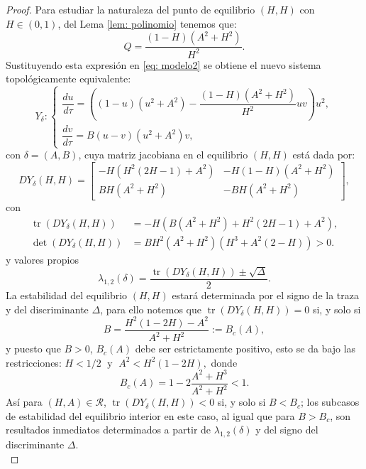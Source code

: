 \documentclass[]{article}
\theoremstyle{remark}
\begin{document}
	\begin{proof}
		Para estudiar la naturaleza del punto de equilibrio $(H,H)$ con $H \in (0,1)$, del Lema \autoref{lem: polinomio} tenemos que: $$Q=\dfrac{(1-H)(A^2+H^{2})}{H^{2}}.$$ Sustituyendo esta expresión en \eqref{eq: modelo2} se obtiene el nuevo sistema topológicamente equivalente:
		\begin{equation}
			Y_{\delta}:
			\begin{cases}
				\dfrac{du}{d \tau} = \left((1 - u)(u^{2} + A^{2}) - \dfrac{(1-H)(A^2+H^{2})}{H^{2}} u v\right)u^{2}, \\[5pt]
				\dfrac{dv}{d \tau} = B(u - v)(u^{2} + A^{2})v,
			\end{cases}
			\label{eq: modelo2.1}
		\end{equation}
		con $\delta = (A, B)$, cuya matriz jacobiana en el equilibrio $(H,H)$ está dada por:
		\begin{equation*}
			DY_\delta(H,H) =
			\begin{bmatrix}
				-H(H^{2}(2H-1)+A^2) & -H(1-H)(A^2+H^2) \\
				BH(A^{2}+H^{2}) & -BH(A^{2}+H^{2})
			\end{bmatrix},
		\end{equation*}
		con
		\begin{equation*}
			\begin{aligned}
				\operatorname{tr}(DY_\delta(H,H)) &= -H(B(A^2+H^2)+H^2(2H-1)+A^2), \\
				\det(DY_\delta(H,H)) &= BH^2(A^2+H^2)(H^3+A^2(2-H)) > 0.
			\end{aligned}
		\end{equation*}
		y valores propios $$\lambda_{1,2}(\delta) = \dfrac{\operatorname{tr}(DY_\delta(H,H)) \pm \sqrt{\Delta}}{2}.$$ La estabilidad del equilibrio $(H,H)$ estará determinada por el signo de la traza y del discriminante $\Delta$, para ello notemos que $\operatorname{tr}(DY_\delta(H,H))=0$ si, y solo si
		\begin{equation*}
			B = \dfrac{H^2(1-2H) - A^2}{A^2 + H^2} := B_c(A),
			\label{eq: Bcritico}
		\end{equation*}
		y puesto que $B>0$, $B_c(A)$ debe ser estrictamente positivo, esto se da bajo las restricciones: $H<1/2 \; \text{ y } \; A^2 < H^2(1-2H),$ donde $$B_c(A)=1-2\dfrac{A^2+H^3}{A^2+H^2}<1.$$ Así para $(H,A) \in \mathcal{R}$, $\operatorname{tr}(DY_\delta(H,H))<0$ si, y solo si $B<B_c$; los subcasos de estabilidad del equilibrio interior en este caso, al igual que para $B>B_c$, son resultados inmediatos determinados a partir de $\lambda_{1,2}(\delta)$ y del signo del discriminante $\Delta.$ \\
		

\end{proof}
\end{document}
